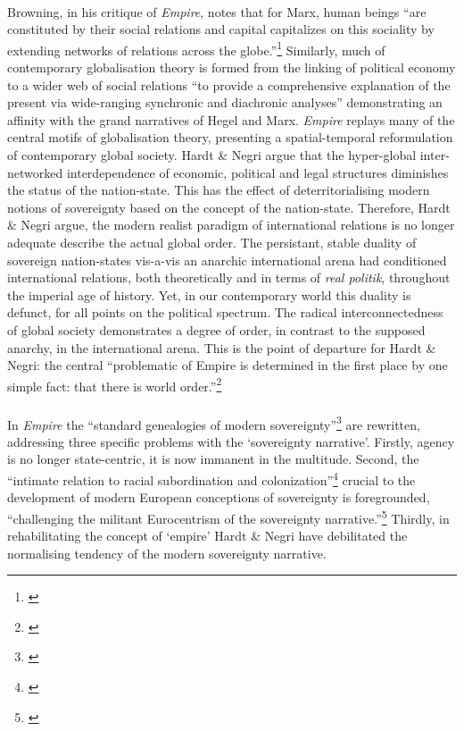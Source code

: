 \documentclass[12pt,a4paper,titlepage]{article}
\begin{document}
\paragraph{}Browning, in his critique of \textit{Empire}, notes that for Marx, human beings ``are constituted by their social relations and capital capitalizes on this sociality by extending networks of relations across the globe.''\footnote{\cite[p. 196]{browning:2005gi}} Similarly, much of contemporary globalisation theory is formed from the linking of political economy to a wider web of social relations ``to provide a comprehensive explanation of the present via wide-ranging synchronic and diachronic analyses'' demonstrating an affinity with the grand narratives of Hegel and Marx. \textit{Empire} replays many of the central motifs of globalisation theory, presenting a spatial-temporal reformulation of contemporary global society. Hardt \& Negri argue that the hyper-global inter-networked interdependence of economic, political and legal structures diminishes the status of the nation-state. This has the effect of deterritorialising modern notions of sovereignty based on the concept of the nation-state. Therefore, Hardt \& Negri argue, the modern realist paradigm of international relations is no longer adequate describe the actual global order. The persistant, stable duality of sovereign nation-states vis-a-vis an anarchic international arena had conditioned international relations, both theoretically and in terms of \textit{real politik}, throughout the imperial age of history. Yet, in our contemporary world this duality is defunct, for all points on the political spectrum. The radical interconnectedness of global society demonstrates a degree of order, in contrast to the supposed anarchy, in the international arena. This is the point of departure for Hardt \& Negri: the central ``problematic of Empire is determined in the first place by one simple fact: that there is world order.''\footnote{\cite[p. 1]{Hardt:2001jl}}

\paragraph{}In \textit{Empire} the ``standard genealogies of modern sovereignty''\footnote{\cite[p. 128]{laffey:2005ri}} are rewritten, addressing three specific problems with the `sovereignty narrative'. Firstly, agency is no longer state-centric, it is now immanent in the multitude. Second, the ``intimate relation to racial subordination and colonization''\footnote{\cite[p. 114]{Hardt:2001jl}} crucial to the development of modern European conceptions of sovereignty is foregrounded, ``challenging the militant Eurocentrism of the sovereignty narrative.''\footnote{\cite[p. 128]{laffey:2005ri}} Thirdly, in rehabilitating the concept of `empire' Hardt \& Negri have debilitated the normalising tendency of the modern sovereignty narrative. 
\end{document}
